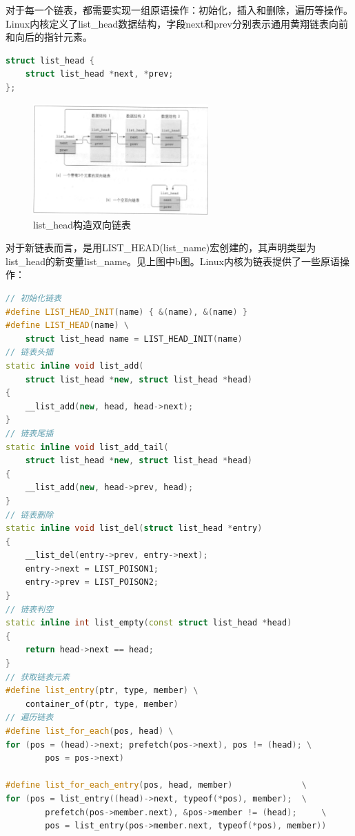     对于每一个链表，都需要实现一组原语操作：初始化，插入和删除，遍历等操作。Linux内核定义了list\_head数据结构，字段next和prev分别表示通用黄翔链表向前和向后的指针元素。

\begin{lstlisting}[language=C++]
struct list_head {
    struct list_head *next, *prev;
};
\end{lstlisting}

\begin{figure}[!htbp]
    \centering
    \includegraphics[width=0.6\textwidth]{image/chapter03/list_head构造双向链表.png}
    \caption{list\_head构造双向链表}
\end{figure}

    对于新链表而言，是用LIST\_HEAD(list\_name)宏创建的，其声明类型为list\_head的新变量list\_name。见上图中b图。Linux内核为链表提供了一些原语操作：

\begin{lstlisting}[language=C++]
// 初始化链表
#define LIST_HEAD_INIT(name) { &(name), &(name) }
#define LIST_HEAD(name) \
    struct list_head name = LIST_HEAD_INIT(name)
// 链表头插
static inline void list_add(
    struct list_head *new, struct list_head *head)
{
    __list_add(new, head, head->next);
}
// 链表尾插
static inline void list_add_tail(
    struct list_head *new, struct list_head *head)
{
	__list_add(new, head->prev, head);
}
// 链表删除
static inline void list_del(struct list_head *entry)
{
	__list_del(entry->prev, entry->next);
	entry->next = LIST_POISON1;
	entry->prev = LIST_POISON2;
}
// 链表判空
static inline int list_empty(const struct list_head *head)
{
	return head->next == head;
}
// 获取链表元素
#define list_entry(ptr, type, member) \
	container_of(ptr, type, member)
// 遍历链表
#define list_for_each(pos, head) \
for (pos = (head)->next; prefetch(pos->next), pos != (head); \
        pos = pos->next)

#define list_for_each_entry(pos, head, member)				\
for (pos = list_entry((head)->next, typeof(*pos), member);	\
        prefetch(pos->member.next), &pos->member != (head); 	\
        pos = list_entry(pos->member.next, typeof(*pos), member))
\end{lstlisting}

